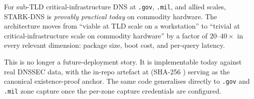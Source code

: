For sub-TLD critical-infrastructure DNS at \texttt{.gov}, \texttt{.mil},
and allied scales, STARK-DNS is \emph{provably practical today} on
commodity hardware.  The architecture moves from ``viable at TLD scale
on a workstation'' to ``trivial at critical-infrastructure scale on
commodity hardware'' by a factor of $20$--$40\times$ in every relevant
dimension: package size, boot cost, and per-query latency.

This is no longer a future-deployment story.  It is implementable
today against real DNSSEC data, with the in-repo artefact at
 (SHA-256
)
serving as the canonical existence-proof anchor.  The same code
generalises directly to \texttt{.gov} and \texttt{.mil} zone capture
once the per-zone capture credentials are configured.
